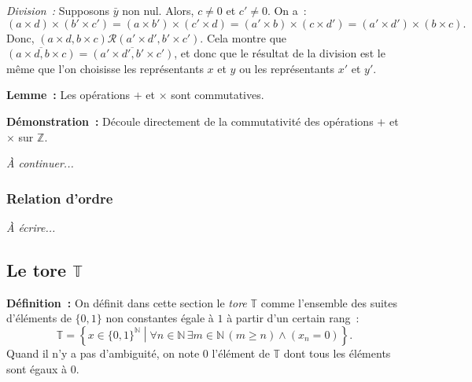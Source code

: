 \noindent\emph{Division :} Supposons $\bar{y}$ non nul. Alors, $c \neq 0$ et $c' \neq 0$.
    On a :
    \begin{equation*}
        (a \times d) \times (b' \times c')
        = (a \times b') \times (c' \times d)
        = (a' \times b) \times (c \times d')
        = (a' \times d') \times (b \times c) .
    \end{equation*}
    Donc, $(a \times d, b \times c) \mathrel{\mathcal{R}} (a' \times d', b' \times c')$. 
    Cela montre que $\overline{(a \times d, b \times c)} = \overline{(a' \times d', b' \times c')}$, et donc que le résultat de la division est le même que l'on choisisse les représentants $x$ et $y$ ou les représentants $x'$ et $y'$.

\done

\medskip

\noindent\textbf{Lemme :} Les opérations $+$ et $\times$ sont commutatives.

\medskip

\noindent\textbf{Démonstration :} Découle directement de la commutativité des opérations $+$ et $\times$ sur $\mathbb{Z}$. 

\done

\medskip

\emph{À continuer...}

\subsubsection{Relation d'ordre}

\emph{À écrire...}

\subsection{Le tore \texorpdfstring{$\mathbb{T}$}{T}}

\noindent\textbf{Définition :} On définit dans cette section le \emph{tore} $\mathbb{T}$ comme l'ensemble des suites d'éléments de $\lbrace 0, 1 \rbrace$ non constantes égale à $1$ à partir d'un certain rang : 
\begin{equation*}
    \mathbb{T} = \left\lbrace
        x \in \lbrace 0, 1 \rbrace^{\mathbb{N}} 
        \middle\vert
        \forall n \in \mathbb{N} \, \exists m \in \mathbb{N} \, (m \geq n) \wedge (x_n = 0)
    \right\rbrace .
\end{equation*}
Quand il n'y a pas d'ambiguité, on note $0$ l'élément de $\mathbb{T}$ dont tous les éléments sont égaux à $0$.

